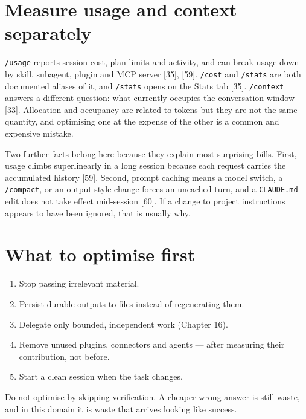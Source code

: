 \documentclass[11pt,a4paper,twoside,openany]{book}
\begin{document}
\FloatBarrier
\setcounter{section}{3}
\section{Measure usage and context separately}

\texttt{/\allowbreak{}usage} reports session cost, plan limits and activity, and can break usage down by skill, subagent, plugin and MCP server [35], [59]. \texttt{/\allowbreak{}cost} and \texttt{/\allowbreak{}stats} are both documented aliases of it, and \texttt{/\allowbreak{}stats} opens on the Stats tab [35]. \texttt{/\allowbreak{}context} answers a different question: what currently occupies the conversation window [33]. Allocation and occupancy are related to tokens but they are not the same quantity, and optimising one at the expense of the other is a common and expensive mistake.


Two further facts belong here because they explain most surprising bills. First, usage climbs superlinearly in a long session because each request carries the accumulated history [59]. Second, prompt caching means a model switch, a \texttt{/\allowbreak{}compact}, or an output-style change forces an uncached turn, and a \texttt{CLAUDE.\allowbreak{}md} edit does not take effect mid-session [60]. If a change to project instructions appears to have been ignored, that is usually why.


\FloatBarrier
\setcounter{section}{4}
\section{What to optimise first}

\begin{enumerate}
\item Stop passing irrelevant material.
\item Persist durable outputs to files instead of regenerating them.
\item Delegate only bounded, independent work (Chapter 16).
\item Remove unused plugins, connectors and agents — after measuring their contribution, not before.
\item Start a clean session when the task changes.
\end{enumerate}

Do not optimise by skipping verification. A cheaper wrong answer is still waste, and in this domain it is waste that arrives looking like success.
\end{document}
